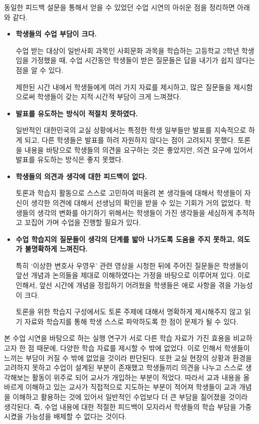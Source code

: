 \documentclass[10pt, a4paper, chapter]{oblivoir}
\begin{document}
\noindent
    동일한 피드백 설문을 통해서 얻을 수 있었던 수업 시연의 아쉬운 점을 정리하면 아래와 같다. 
    \begin{itemize}
        \item \textbf{학생들의 수업 부담이 크다.}
        
        수업 받는 대상이 일반사회 과목인 사회문화 과목을 학습하는 고등학교 2학년 학생임을 가정했을 때, 수업 시간동안 학생들이 받은 질문들은 답을 내기가
        쉽지 않다는 점을 알 수 있다. 

        제한된 시간 내에서 학생들에게 여러 가지 자료를 제시하고, 많은 질문들을 제시함으로써 학생들이 갖는 지적$\cdot$시간적 부담이 크게 느껴졌다.

        \item \textbf{발표를 유도하는 방식이 적절치 못하였다.}
        
        일반적인 대한민국의 교실 상황에서는 특정한 학생 일부들만 발표를 지속적으로 하게 되고, 다른 학생들은 발표를 하려 자원하지 않다는 점이 고려되지 못했다. 
        토론을 내용을 바탕으로 학생들의 의견을 요구하는 것은 좋았지만, 의견 요구에 있어서 발표를 유도하는 방식은 좋지 못했다. 

        \item \textbf{학생들의 의견과 생각에 대한 피드백이 없다.}
        
        토론과 학습지 활동으로 스스로 고민하여 떠올려 본 생각들에 대해서 학생들이 자신이 생각한 의견에 대해서 선생님의 확인을 받을 수 있는 기회가 거의 없었다.
        학생들의 생각의 변화를 야기하기 위해서는 학생들이 가진 생각들을 세심하게 추적하고 꼬집어 가며 수업을 진행할 필요가 있다. 

        \item \textbf{수업 학습지의 질문들이 생각의 단계를 밟아 나가도록 도움을 주지 못하고, 의도가 불명확하게 느껴진다.}
        
        특히 `이상한 변호사 우영우' 관련 영상을 시청한 뒤에 주어진 질문들은 학생들이 앞선 개념과 논의들을 제대로 이해하였다는 가정을 바탕으로 
        이루어져 있다. 이로 인해서, 앞선 시간에 개념을 정립하기 어려웠을 학생들은 애로 사항을 겪을 가능성이 크다.

        토론을 위한 학습지 구성에서도 토론 주제에 대해서 명확하게 제시해주지 않고 읽기 자료와 학습지를 통해 학생 스스로 파악하도록 한 점이 문제가 될 수 있다.
    \end{itemize}
\noindent
    본 수업 시연을 바탕으로 하는 실행 연구가 서로 다른 학습 자료가 가진 효용을 비교하고자 한 점 때문에, 다양한 학습 자료를 제시할 수 밖에 없었다. 이로 인해서 학생들이 느끼는 부담이 커질 수 밖에 없었을 것이라 판단된다. 
    또한 교실 현장의 상황과 환경을 고려하지 못하고 수업이 설계된 부분이 존재했고 학생들끼리 의견을 나누고 스스로 생각해보는 활동이 위주로 되어 교사가 개입하는 부분이 적었다. 
    따라서 교과 내용을 올바르게 이해하고 있는 교사가 직접적으로 지도하는 부분이 적어져 학생들이 교과 개념을 이해하고 활용하는 것에 있어서 일반적인 수업보다 더 큰 부담을 짊어졌을 것이라 생각된다. 즉, 수업 내용에 대한 적절한 피드백이 모자라서 학생들의 학습 부담을 가중시켰을 가능성을 배제할 수 없다는 것이다. 
\end{document}
